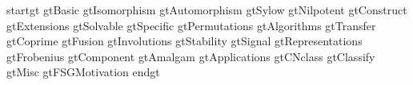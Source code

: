  {startgt}
 {gtBasic}
 {gtIsomorphism}
 {gtAutomorphism}
 {gtSylow}
 {gtNilpotent}
 {gtConstruct}
 {gtExtensions}
 {gtSolvable}
 {gtSpecific}
 {gtPermutations}
 {gtAlgorithms}
 {gtTransfer}
 {gtCoprime}
 {gtFusion}
 {gtInvolutions}
 {gtStability}
 {gtSignal}
 {gtRepresentations}
 {gtFrobenius}
 {gtComponent}
 {gtAmalgam}
 {gtApplications}
 {gtCNclass}
 {gtClassify}
 {gtMisc}
 {gtFSGMotivation}
 {endgt}


